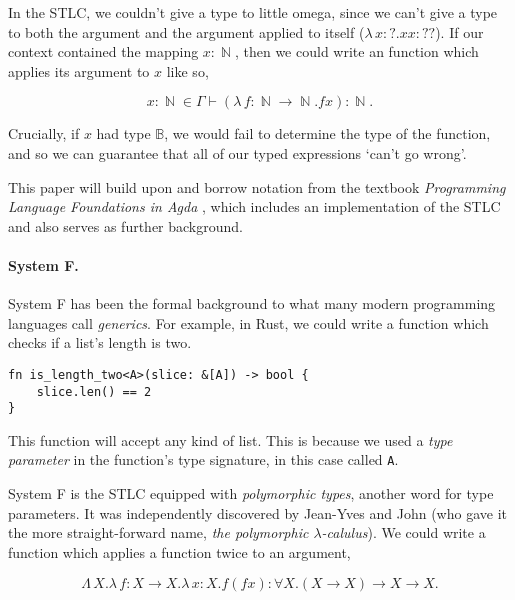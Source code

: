 \documentclass[logo,bsc,singlespacing,parskip,online]{infthesis}
\DeclareMathOperator{\nat}{\mathbb{N}}
\begin{document}
In the STLC, we couldn't give a type to little omega, since we can't give a type to both the argument and the argument applied to itself ($\lambda \, x  \colon ? . x x \colon ??$). If our context contained the mapping $x \colon \nat$, then we could write an function which applies its argument to $x$ like so,

\begin{equation*}
  x \colon \nat \in \Gamma \vdash (\lambda \, f \colon \nat \to \nat . f x) \colon \nat.
\end{equation*}

Crucially, if $x$ had type $\mathbb{B}$, we would fail to determine the type of the function, and so we can guarantee that all of our typed expressions `can't go wrong'. \citep{milner_theory_1978}

This paper will build upon and borrow notation from the textbook \textit{Programming Language Foundations in Agda} \citep{wadler_programming_2022}, which includes an implementation of the STLC and also serves as further background.

\paragraph*{System F.} System F has been the formal background to what many modern programming languages call \textit{generics}. For example, in Rust, we could write a function which checks if a list's length is two.

\begin{verbatim}
fn is_length_two<A>(slice: &[A]) -> bool {
    slice.len() == 2
}
\end{verbatim}

This function will accept any kind of list. This is because we used a \textit{type parameter} in the function's type signature, in this case called \texttt{A}.

System F is the STLC equipped with \textit{polymorphic types}, another word for type parameters. It was independently discovered by Jean-Yves \citet{girard_interpretation_1972} and John \citet{goos_towards_1974} (who gave it the more straight-forward name, \textit{the polymorphic $\lambda$-calulus}). We could write a function which applies a function twice to an argument,

\begin{equation*}
  \Lambda \, X. \lambda \, f \colon X \to X . \lambda \, x \colon X . f (f x) \colon \forall X . (X \to X) \to X \to X.
\end{equation*}
\end{document}
